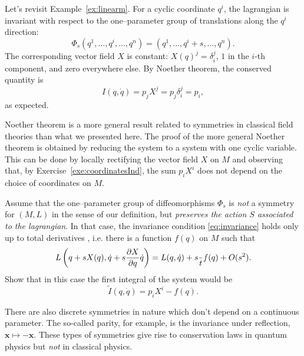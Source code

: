 \documentclass[english,fontsize=11pt,paper=a5,oneside]{scrbook}
\newcommand{\bx}{\bm{x}}
\let\d\relax
\DeclareMathOperator{\d}{d}
\theoremstyle{definition}
\newenvironment{remark}
  {\pushQED{\qed}\renewcommand{\qedsymbol}{$\lozenge$}\remarkx}
  {\popQED\endremarkx}
\newenvironment{example}
  {\pushQED{\qed}\renewcommand{\qedsymbol}{$\lozenge$}\examplex}
  {\popQED\endexamplex}
\newenvironment{exercise}
  {\pushQED{\qed}\renewcommand{\qedsymbol}{$\maltese$}\exercisex}
  {\popQED\endexercisex}
\begin{document}
\begin{example}[kinetic momentum - reprise]\label{exa:kmom}
    Let's revisit Example~\ref{ex:linearm}.
    For a cyclic coordinate $q^i$, the lagrangian is invariant with respect to the one--parameter group of translations along the $q^i$ direction:
    \begin{equation}
        \Phi_s(q^1, \ldots, q^i, \ldots, q^n) = (q^1, \ldots, q^i + s, \ldots, q^n).
    \end{equation}
    The corresponding vector field $X$ is constant: $X(q)^j = \delta^j_i$, $1$ in the $i$-th component, and zero everywhere else.
    By Noether theorem, the conserved quantity is
    \begin{equation}
        I(q,\dot q) = p_j X^j = p_j \delta^j_i = p_i,
    \end{equation}
    as expected.
\end{example}

\begin{remark}
    Noether theorem is a more general result related to symmetries in classical field theories than what we presented here.
    The proof of the more general Noether theorem is obtained by reducing the system to a system with one cyclic variable.
    This can be done by locally rectifying the vector field $X$ on $M$ and observing that, by Exercise~\ref{exe:coordinatesInd}, the sum $p_i X^i$ does not depend on the choice of coordinates on $M$.
\end{remark}

\begin{exercise}
    Assume that the one--parameter group of diffeomorphisms $\Phi_s$ is \emph{not} a symmetry for $(M,L)$ in the sense of our definition, but \emph{preserves the action $S$ associated to the lagrangian}.
    In that case, the invariance condition \eqref{eq:invariance} holds only up to total derivatives \cite[Chapter 4.20]{book:gelfand}, i.e. there is a function $f(q)$ on $M$ such that
    \begin{equation}
        L\left( q + s X(q), \dot q + s \frac{\partial X}{\partial q} \dot q\right)
        = L(q, \dot q) + s \frac{\d}{\d t}f(q) + O(s^2).
    \end{equation}
    Show that in this case the first integral of the system would be
    \begin{equation}
        \widetilde I(q, \dot q) = p_i X^i - f(q).
    \end{equation}
\end{exercise}

\begin{remark}
    There are also discrete symmetries in nature which don't depend on a continuous parameter. The so-called parity, for example, is the invariance under reflection, $\bx \mapsto -\bx$.
    These types of symmetries give rise to conservation laws in quantum physics but \emph{not} in classical physics.
\end{remark}
\end{document}
